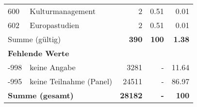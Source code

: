 \begin{longtable}{lXrrr}
        600 & \multicolumn{1}{X}{Kulturmanagement} & %
          \num{2} &
          \num[round-mode=places,round-precision=2]{0.51} &
          \num[round-mode=places,round-precision=2]{0.01} \\

        602 & \multicolumn{1}{X}{Europastudien} & %
          \num{2} &
          \num[round-mode=places,round-precision=2]{0.51} &
          \num[round-mode=places,round-precision=2]{0.01} \\

     \midrule
     \multicolumn{2}{l}{Summe (gültig)} &
       \textbf{\num{390}} &
     \textbf{100} &
       \textbf{\num[round-mode=places,round-precision=2]{1.38}} \\
     \multicolumn{5}{l}{\textbf{Fehlende Werte}}\\
       -998 &
       keine Angabe &
         \num{3281} &
        - &
         \num[round-mode=places,round-precision=2]{11.64} \\
       -995 &
       keine Teilnahme (Panel) &
         \num{24511} &
        - &
         \num[round-mode=places,round-precision=2]{86.97} \\
     \midrule
     \multicolumn{2}{l}{\textbf{Summe (gesamt)}} &
          \textbf{\num{28182}} &
        \textbf{-} &
        \textbf{100} \\
     \bottomrule
     \end{longtable}
     
